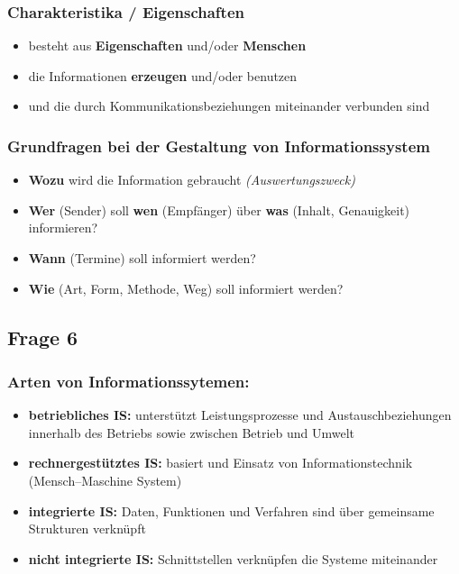 \documentclass[a4paper]{article}
\begin{document}
\subsubsection*{Charakteristika / Eigenschaften}
\begin{itemize}
	\item besteht aus \textbf{Eigenschaften} und/oder \textbf{Menschen}
	\item die Informationen \textbf{erzeugen} und/oder benutzen
	\item und die durch Kommunikationsbeziehungen miteinander verbunden sind
\end{itemize}
\hrulefill
\subsubsection*{Grundfragen bei der Gestaltung von Informationssystem}
\begin{itemize}
	\item \textbf{Wozu} wird die Information gebraucht \textit{(Auswertungszweck)}
	\item \textbf{Wer} (Sender) soll \textbf{wen} (Empfänger) über \textbf{was} (Inhalt, Genauigkeit) informieren?
	\item \textbf{Wann} (Termine) soll informiert werden?
	\item \textbf{Wie} (Art, Form, Methode, Weg) soll informiert werden?
\end{itemize}

\subsection*{Frage 6}
\label{le1-6}
\subsubsection*{Arten von Informationssytemen:}
\begin{itemize}
	\item \textbf{betriebliches IS:} unterstützt Leistungsprozesse und Austauschbeziehungen innerhalb des Betriebs sowie zwischen Betrieb und Umwelt
	\item \textbf{rechnergestütztes IS:} basiert und Einsatz von Informationstechnik (Mensch--Maschine System)
	\item \textbf{integrierte IS:} Daten, Funktionen und Verfahren sind über gemeinsame Strukturen verknüpft
	\item \textbf{nicht integrierte IS:} Schnittstellen verknüpfen die Systeme miteinander
\end{itemize}
\end{document}
